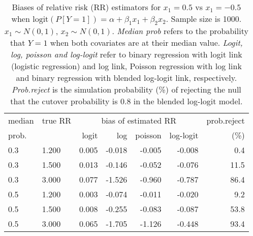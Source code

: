 \documentclass[12pt,a4paper]{article}
\begin{document}
\begin{table}[H] 
\small\sf\centering 
\caption{Biases of relative risk (RR) estimators for $x_1=0.5$ vs $x_1=-0.5$ when $\mbox{logit}(P[Y=1])=\alpha+\beta_1 x_1 + \beta_2 x_2$. Sample size is 1000. $x_1 \sim $$N(0,1)$, $x_2 \sim N(0,1)$. {\it Median prob} refers to the probability that $Y=1$ when both covariates are at their median value. {\it Logit, log, poisson and log-logit} refer to binary regression with logit link (logistic regression) and log link, Poisson regression with log link and binary regression with blended log-logit link, respectively. {\it Prob.reject} is the simulation probability (\%) of rejecting the null that the cutover probability is $0.8$ in the blended log-logit model.} 
\begin{tabular}{llrrrrr} 
\toprule 
median & true RR & \multicolumn{4}{c}{bias of estimated RR} & prob.reject \\ 
prob. & & logit & log & poisson & log-logit  & (\%) \\ \midrule 
0.3 & 1.200 & 0.005 & -0.018 & -0.005 & -0.008 &  0.4 \\  
0.3 & 1.500 & 0.013 & -0.146 & -0.052 & -0.076 & 11.5 \\  
0.3 & 3.000 & 0.077 & -1.526 & -0.960 & -0.787 & 86.4 \\  
0.5 & 1.200 & 0.003 & -0.074 & -0.011 & -0.020 &  9.2 \\  
0.5 & 1.500 & 0.008 & -0.255 & -0.083 & -0.087 & 53.8 \\  
0.5 & 3.000 & 0.065 & -1.705 & -1.126 & -0.448 & 93.4 \\  
\bottomrule 
\end{tabular} 
\end{table} 
\end{document}
